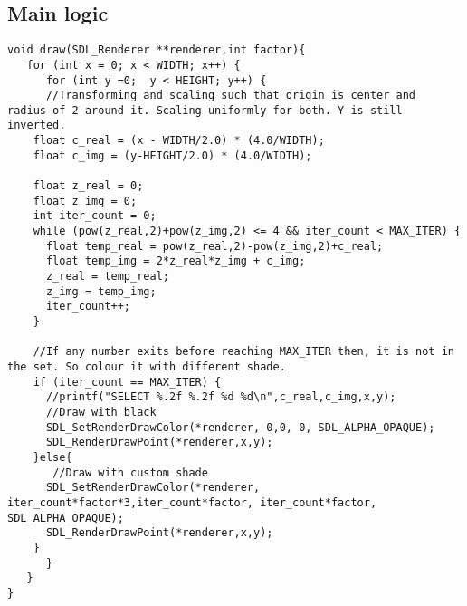 \documentclass[a4paper,11pt]{article}
\begin{document}
\subsection{Main logic}
\label{sec:org377789a}
\begin{verbatim}
void draw(SDL_Renderer **renderer,int factor){
   for (int x = 0; x < WIDTH; x++) {
      for (int y =0;  y < HEIGHT; y++) {
      //Transforming and scaling such that origin is center and  radius of 2 around it. Scaling uniformly for both. Y is still inverted.
	float c_real = (x - WIDTH/2.0) * (4.0/WIDTH); 
	float c_img = (y-HEIGHT/2.0) * (4.0/WIDTH); 

	float z_real = 0;
	float z_img = 0;
	int iter_count = 0;
	while (pow(z_real,2)+pow(z_img,2) <= 4 && iter_count < MAX_ITER) {
	  float temp_real = pow(z_real,2)-pow(z_img,2)+c_real;
	  float temp_img = 2*z_real*z_img + c_img;
	  z_real = temp_real;
	  z_img = temp_img;
	  iter_count++;
	}

	//If any number exits before reaching MAX_ITER then, it is not in the set. So colour it with different shade.
	if (iter_count == MAX_ITER) {
	  //printf("SELECT %.2f %.2f %d %d\n",c_real,c_img,x,y);
	  //Draw with black
	  SDL_SetRenderDrawColor(*renderer, 0,0, 0, SDL_ALPHA_OPAQUE);
	  SDL_RenderDrawPoint(*renderer,x,y);
	}else{
	   //Draw with custom shade
	  SDL_SetRenderDrawColor(*renderer, iter_count*factor*3,iter_count*factor, iter_count*factor, SDL_ALPHA_OPAQUE);
	  SDL_RenderDrawPoint(*renderer,x,y);
	}
      }
   }
}


\end{verbatim}
\end{document}
